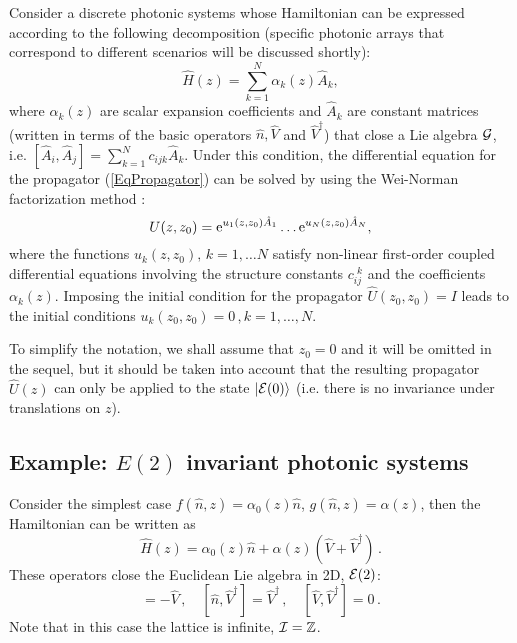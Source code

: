 \documentclass[12pt]{iopart}
\newcommand{\ket}[1]{ |#1\rangle}
\begin{document}
Consider a discrete photonic systems whose Hamiltonian can be expressed according to the following decomposition (specific photonic arrays that correspond to different scenarios will be discussed shortly):
%
\begin{equation}
\hat{H}(z)=\sum_{k=1}^N \alpha_k(z) \hat{A}_k,
\end{equation}
%
where $\alpha_k(z)$ are scalar expansion coefficients and $\hat{A}_k$ are constant matrices (written in terms of the basic operators
$\hat{n},\hat{V}$ and $\hat{V}^\dag$) that close a Lie algebra ${\cal G}$, i.e. $[ \hat{A}_i,\hat{A}_j]=\sum_{k=1}^N c_{ijk}\hat{A}_k$.
Under this condition, the differential equation for the propagator  (\ref{EqPropagator}) can be solved by using the Wei-Norman factorization method \cite{WeiNorman,Vance,Vance2}:
%
\begin{equation}
U(z,z_0)={\rm e}^{u_1(z,z_0)\hat{A}_1} \ldots {\rm e}^{u_N(z,z_0)\hat{A}_N},
\end{equation}
where the functions $u_k(z,z_0),\,k=1,\ldots N$ satisfy non-linear first-order coupled
differential
equations involving the structure
constants $c_{ij}^{\,\,k}$ and the coefficients $\alpha_k(z)$.
Imposing the initial condition for the propagator
$\hat{U}(z_0,z_0)=I$ leads to the initial conditions $u_k(z_0,z_0)=0\,,k=1,\ldots,N$.



To simplify the notation, we shall assume that $z_0=0$ and it will be omitted in
the sequel, but it should be taken into account that the resulting propagator
$\hat{U}(z)$ can only be applied to the state $\ket{{\cal E}(0)}$ (i.e. there
is no  invariance under translations on $z$).




\subsection{Example: $E(2)$ invariant photonic systems}

Consider the simplest case $f(\hat{n},z)=\alpha_0(z)\hat{n}$, $g(\hat{n},z)=\alpha(z)$, then the Hamiltonian can be written
as
\begin{equation}
\hat{H}(z)= \alpha_0(z) \hat{n}+\alpha(z)( \hat{V} +\hat{V}^\dag)\,.
\end{equation}
These operators close the Euclidean Lie algebra in 2D, ${\cal E}(2)$:
\begin{equation}
[\hat{n},\hat{V}]=-\hat{V}\,,\quad[\hat{n},\hat{V}^\dag]=\hat{V}^\dag\,,\quad[\hat{V},\hat{V}^\dag]=0\,.
\end{equation}
Note that in this case
the lattice is infinite, ${\cal I}=\mathbb{Z}$.
\end{document}
